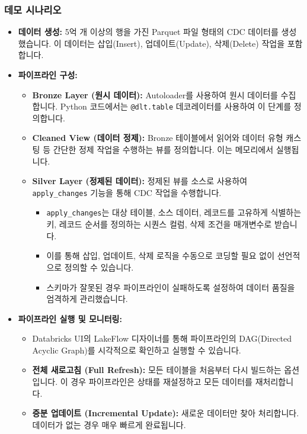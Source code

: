 \documentclass[11pt,a4paper]{article}
\begin{document}
\begin{enumerate}
\subsubsection{데모 시나리오}
\begin{itemize}
    \item \textbf{데이터 생성:} 5억 개 이상의 행을 가진 Parquet 파일 형태의 CDC 데이터를 생성했습니다. 이 데이터는 삽입(Insert), 업데이트(Update), 삭제(Delete) 작업을 포함합니다.
    \item \textbf{파이프라인 구성:}
    \begin{itemize}
        \item \textbf{Bronze Layer (원시 데이터):} Autoloader를 사용하여 원시 데이터를 수집합니다. Python 코드에서는 \texttt{@dlt.table} 데코레이터를 사용하여 이 단계를 정의합니다.
        \item \textbf{Cleaned View (데이터 정제):} Bronze 테이블에서 읽어와 데이터 유형 캐스팅 등 간단한 정제 작업을 수행하는 뷰를 정의합니다. 이는 메모리에서 실행됩니다.
        \item \textbf{Silver Layer (정제된 데이터):} 정제된 뷰를 소스로 사용하여 \texttt{apply_changes} 기능을 통해 CDC 작업을 수행합니다.
        \begin{itemize}
            \item \texttt{apply_changes}는 대상 테이블, 소스 데이터, 레코드를 고유하게 식별하는 키, 레코드 순서를 정의하는 시퀀스 컬럼, 삭제 조건을 매개변수로 받습니다.
            \item 이를 통해 삽입, 업데이트, 삭제 로직을 수동으로 코딩할 필요 없이 선언적으로 정의할 수 있습니다.
            \item 스키마가 잘못된 경우 파이프라인이 실패하도록 설정하여 데이터 품질을 엄격하게 관리했습니다.
        \end{itemize}
    \end{itemize}
    \item \textbf{파이프라인 실행 및 모니터링:}
    \begin{itemize}
        \item Databricks UI의 LakeFlow 디자이너를 통해 파이프라인의 DAG(Directed Acyclic Graph)를 시각적으로 확인하고 실행할 수 있습니다.
        \item \textbf{전체 새로고침 (Full Refresh):} 모든 테이블을 처음부터 다시 빌드하는 옵션입니다. 이 경우 파이프라인은 상태를 재설정하고 모든 데이터를 재처리합니다.
        \item \textbf{증분 업데이트 (Incremental Update):} 새로운 데이터만 찾아 처리합니다. 데이터가 없는 경우 매우 빠르게 완료됩니다.

\end{itemize}
\end{itemize}
\end{enumerate}
\end{document}

